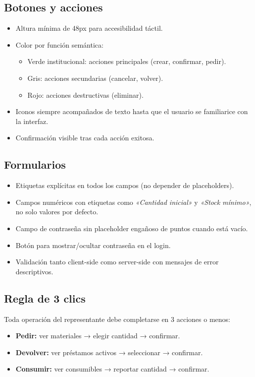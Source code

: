 \documentclass[12pt,a4paper,oneside]{report}
\begin{document}
\subsection{Botones y acciones}

\begin{itemize}
  \item Altura mínima de 48px para accesibilidad táctil.
  \item Color por función semántica:
    \begin{itemize}
      \item Verde institucional: acciones principales (crear, confirmar, pedir).
      \item Gris: acciones secundarias (cancelar, volver).
      \item Rojo: acciones destructivas (eliminar).
    \end{itemize}
  \item Iconos siempre acompañados de texto hasta que el usuario se familiarice con la interfaz.
  \item Confirmación visible tras cada acción exitosa.
\end{itemize}

\subsection{Formularios}

\begin{itemize}
  \item Etiquetas explícitas en todos los campos (no depender de placeholders).
  \item Campos numéricos con etiquetas como \textit{«Cantidad inicial»} y \textit{«Stock mínimo»}, no solo valores por defecto.
  \item Campo de contraseña sin placeholder engañoso de puntos cuando está vacío.
  \item Botón para mostrar/ocultar contraseña en el login.
  \item Validación tanto client-side como server-side con mensajes de error descriptivos.
\end{itemize}

\subsection{Regla de 3 clics}

Toda operación del representante debe completarse en 3 acciones o menos:

\begin{itemize}
  \item \textbf{Pedir:} ver materiales → elegir cantidad → confirmar.
  \item \textbf{Devolver:} ver préstamos activos → seleccionar → confirmar.
  \item \textbf{Consumir:} ver consumibles → reportar cantidad → confirmar.
\end{itemize}
\end{document}
